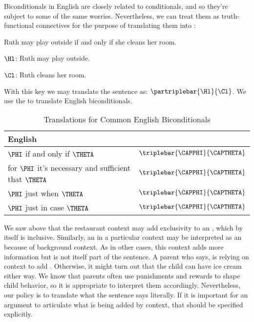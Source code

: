 Biconditionals in English are closely related to conditionals, and so they're subject to some of the same worries.  Nevertheless, we can treat them as truth-functional connectives for the purpose of translating them into \GSL{}:

\begin{menumerate}
	\item Ruth may play outside if and only if she cleans her room.
\end{menumerate}

	\begin{description}[itemsep=0em]
		\item[Translation Key:] \hfill{} 
		\begin{description}[itemsep=0em]
			\item $\Hl$: Ruth may play outside.
			\item $\Cl$: Ruth cleans her room.
		\end{description} 
	\end{description}

\noindent{}With this key we may translate the sentence as: $\partriplebar{\Hl}{\Cl}$.  We use the \mention{$\TRIPLEBAR$} to translate English biconditionals.

\begin{table}
	\renewcommand{\arraystretch}{1.5}%
	\begin{center}
		\begin{tabular}{ l l } %
			\toprule
			\textbf{English} & \textbf{\GSL{}} \\ 
			\midrule
			$\PHI$ if and only if $\THETA$ & $\triplebar{\CAPPHI}{\CAPTHETA}$ \\
			for $\PHI$ it's necessary and sufficient that $\THETA$ & $\triplebar{\CAPPHI}{\CAPTHETA}$ \\
			$\PHI$ just when $\THETA$ & $\triplebar{\CAPPHI}{\CAPTHETA}$ \\
			$\PHI$ just in case $\THETA$ & $\triplebar{\CAPPHI}{\CAPTHETA}$ \\
			\bottomrule
		\end{tabular} 
		\caption{Translations for Common English Biconditionals}
		\label{TransTableB}
	\end{center}
\end{table}

We saw above that the restaurant context may add exclusivity to an , which by itself is inclusive.  Similarly, an  in a particular context may be interpreted as an  because of background context.  As in other cases, this context adds more information but is not itself part of the sentence.  A parent who says,  is relying on context to add .  Otherwise, it might turn out that the child can have ice cream either way.  We know that parents often use punishments and rewards to shape child behavior, so it is appropriate to interpret them accordingly.  Nevertheless, our policy is to translate what the sentence says literally. If it is important for an argument to articulate what is being added by context, that should be specified explicitly.

